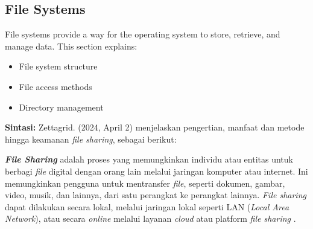 \documentclass[12pt]{article}
\begin{document}
\subsection{File Systems}
File systems provide a way for the operating system to store, retrieve, and manage data. This section explains:
\begin{itemize}
    \item File system structure
    \item File access methods
    \item Directory management
\end{itemize}
\textbf{Sintasi:} Zettagrid. (2024, April 2) menjelaskan pengertian, manfaat dan metode hingga keamanan \textit{file sharing}, sebagai berikut:
\item \textbf{\textit{File Sharing}} adalah proses yang memungkinkan individu atau entitas untuk berbagi \textit{file} digital dengan orang lain melalui jaringan komputer atau internet. Ini memungkinkan pengguna untuk mentransfer \textit{file}, seperti dokumen, gambar, video, musik, dan lainnya, dari satu perangkat ke perangkat lainnya. \textit{File sharing} dapat dilakukan secara lokal, melalui jaringan lokal seperti LAN (\textit{Local Area Network}), atau secara \textit{online} melalui layanan\textit{ cloud} atau platform \textit{file sharing} .
\end{document}
